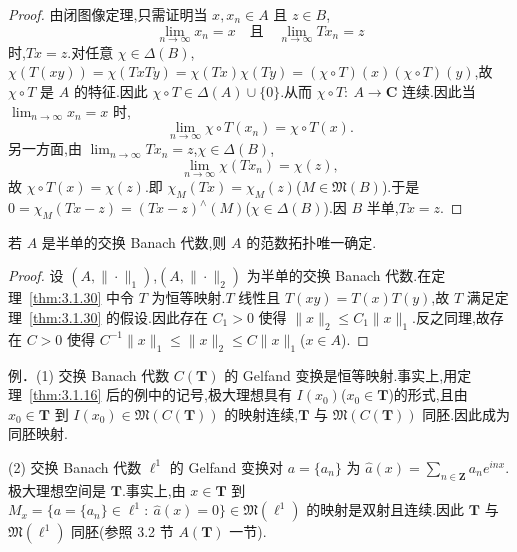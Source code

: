 \begin{proof}
由闭图像定理,只需证明当 $x, x_{n} \in A$ 且 $z \in B$,
\begin{equation*}
\lim_{n \to \infty} x_{n} = x \quad \text{且} \quad \lim_{n \to \infty} Tx_{n} = z
\end{equation*}
时,$Tx = z$.对任意 $\chi \in \Delta(B)$,$\chi(T(xy)) = \chi(TxTy) = \chi(Tx)\chi(Ty) = (\chi \circ T)(x)(\chi \circ T)(y)$,故 $\chi \circ T$ 是 $A$ 的特征.因此 $\chi \circ T \in \Delta(A) \cup \{0\}$.从而 $\chi \circ T:\ A \to \mathbf{C}$ 连续.因此当 $\lim_{n \to \infty} x_{n} = x$ 时,
\begin{equation*}
\lim_{n \to \infty}\chi \circ T(x_{n}) = \chi \circ T(x).
\end{equation*}
另一方面,由 $\lim_{n \to \infty} Tx_{n} = z$,$\chi \in \Delta(B)$,
\begin{equation*}
\lim_{n \to \infty}\chi(Tx_{n}) = \chi(z),
\end{equation*}
故 $\chi \circ T(x) = \chi(z)$.即 $\chi_{M}(Tx) = \chi_{M}(z)$($M \in \mathfrak{M}(B)$).于是 $0 = \chi_{M}(Tx - z) = (Tx - z)^{\wedge}(M)$($\chi \in \Delta(B)$).因 $B$ 半单,$Tx = z$.
\end{proof}

\begin{corollary}\label{cor:3.1.31}
若 $A$ 是半单的交换 Banach 代数,则 $A$ 的范数拓扑唯一确定.
\end{corollary}

\begin{proof}
设 $(A, \|\cdot\|_{1})$,$(A, \|\cdot\|_{2})$ 为半单的交换 Banach 代数.在定理~\ref{thm:3.1.30} 中令 $T$ 为恒等映射.$T$ 线性且 $T(xy) = T(x)T(y)$,故 $T$ 满足定理~\ref{thm:3.1.30} 的假设.因此存在 $C_{1} > 0$ 使得 $\|x\|_{2} \leq C_{1}\|x\|_{1}$.反之同理,故存在 $C > 0$ 使得 $C^{-1}\|x\|_{1} \leq \|x\|_{2} \leq C\|x\|_{1}$($x \in A$).
\end{proof}

例．(1) 交换 Banach 代数 $C(\mathbf{T})$ 的 Gelfand 变换是恒等映射.事实上,用定理~\ref{thm:3.1.16} 后的例中的记号,极大理想具有 $I(x_{0})$($x_{0} \in \mathbf{T}$)的形式,且由 $x_{0} \in \mathbf{T}$ 到 $I(x_{0}) \in \mathfrak{M}(C(\mathbf{T}))$ 的映射连续,$\mathbf{T}$ 与 $\mathfrak{M}(C(\mathbf{T}))$ 同胚.因此成为同胚映射.

(2) 交换 Banach 代数 $\ell^{1}$ 的 Gelfand 变换对 $a = \{a_{n}\}$ 为 $\hat{a}(x) = \sum_{n \in \mathbf{Z}} a_{n}e^{inx}$.极大理想空间是 $\mathbf{T}$.事实上,由 $x \in \mathbf{T}$ 到 $M_{x} = \{a = \{a_{n}\} \in \ell^{1}:\ \hat{a}(x) = 0\} \in \mathfrak{M}(\ell^{1})$ 的映射是双射且连续.因此 $\mathbf{T}$ 与 $\mathfrak{M}(\ell^{1})$ 同胚(参照 3.2 节 $A(\mathbf{T})$ 一节).

